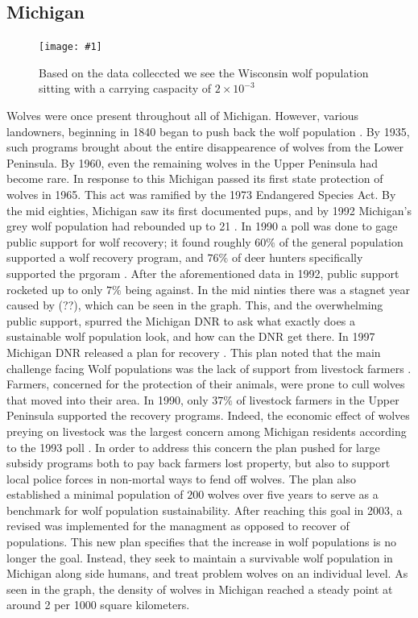 \documentclass[12pt]{article}
\newcommand{\rimage}[2]{
\begin{figure}
    \begin{center}
\texttt{[image: \#1]}
\caption{#2}
    \end{center}
\end{figure}
}
\begin{document}
\subsection{Michigan}
\rimage{michigan.png}{Based on the data colleccted we see the Wisconsin wolf population sitting with a carrying caspacity of $2 \times 10^{-3}$}

Wolves were once present throughout all of Michigan.
However, various landowners, beginning in 1840 began to push back the wolf population \cite{HistoryMI}.
By 1935, such programs brought about the entire disappearence of wolves from the Lower Peninsula.
By 1960, even the remaining wolves in the Upper Peninsula  had become rare.
In response to this Michigan passed its first state protection of wolves in 1965.
This act was ramified by the 1973 Endangered Species Act.
By the mid eighties, Michigan saw its first documented pups,
and by 1992 Michigan's grey wolf population had rebounded up to 21 \cite{HistoryMI}.
In 1990 a poll was done to gage public support for wolf recovery;
it found roughly $60\%$ of the general population supported a wolf recovery program, 
and $76\%$ of deer hunters specifically supported the prgoram \cite{1997PlanMI}.
After the aforementioned data in 1992,
public support rocketed up to only $7\%$ being against.
In the mid ninties there was a stagnet year caused by (??), which can be seen in the graph.
This, and the overwhelming public support,
spurred the Michigan DNR to ask what exactly does a sustainable wolf population look,
and how can the DNR get there.
In 1997 Michigan DNR released a plan for recovery \cite{1997PlanMI}.
This plan noted that the main challenge facing Wolf populations was the lack of support from livestock farmers \cite{1997PlanMI}.
Farmers, concerned for the protection of their animals, were prone to cull wolves that moved into their area.
In 1990, only $37\%$ of livestock farmers in the Upper Peninsula supported the recovery programs.
Indeed, the economic effect of wolves preying on livestock was the largest concern among Michigan residents according to the 1993 poll 
    \cite{1997PlanMI}.
In order to address this concern the plan pushed for large subsidy programs both to pay back farmers lost property,
    but also to support local police forces in non-mortal ways to fend off wolves.
The plan also established a minimal population of $200$ wolves over five years to serve as a benchmark for wolf population sustainability.
After reaching this goal in 2003,
a revised was implemented for the managment as opposed to recover of populations.
This new plan specifies that the increase in wolf populations is no longer the goal.
Instead, they seek to maintain a survivable wolf population in Michigan along side humans,
    and treat problem wolves on an individual level.
As seen in the graph, the density of wolves in Michigan reached a steady point at around 2 per 1000 square kilometers.
\end{document}
